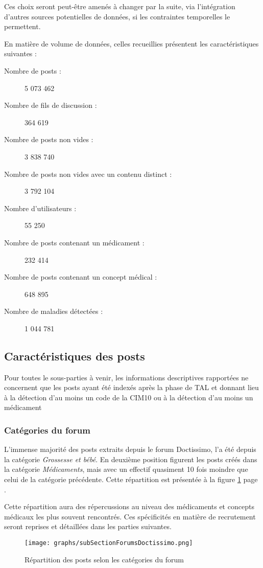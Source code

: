 \documentclass[a4paper, 12pt, openany, oneside, abstract=on]{article} %
\begin{document}
Ces choix seront peut-être amenés à changer par la suite, via l'intégration d'autres sources potentielles de données, si les contraintes temporelles le permettent.

En matière de volume de données, celles recueillies présentent les caractéristiques suivantes :
\begin{description}
    \item[Nombre de posts :] 5 073 462
    \item[Nombre de fils de discussion :] 364 619
    \item[Nombre de posts non vides :] 3 838 740
    \item[Nombre de posts non vides avec un contenu distinct :] 3 792 104
    \item[Nombre d'utilisateurs :] 55 250
    \item[Nombre de posts contenant un médicament :] 232 414
    \item[Nombre de posts contenant un concept médical :] 648 895
    \item[Nombre de maladies détectées :] 1 044 781
\end{description}

\subsection{Caractéristiques des posts}
Pour toutes le sous-parties à venir, les informations descriptives rapportées ne concernent que les posts ayant été indexés après la phase de TAL et donnant lieu à la détection d'au moins un code de la CIM10 ou à la détection d'au moins un médicament

\subsubsection{Catégories du forum}
L'immense majorité des posts extraits depuis le forum Doctissimo, l'a été depuis la catégorie \emph{Grossesse et bébé}. En deuxième position figurent les posts créés dans la catégorie \emph{Médicaments}, mais avec un effectif quasiment 10 fois moindre que celui de la catégorie précédente. Cette répartition est présentée à la figure \ref{fig:EffCtgForum} page \pageref{fig:EffCtgForum}.

Cette répartition aura des répercussions au niveau des médicaments et concepts médicaux les plus souvent rencontrés. Ces spécificités en matière de recrutement seront reprises et détaillées dans les parties suivantes.
\begin{figure}[H]
    \centering
    \texttt{[image: graphs/subSectionForumsDoctissimo.png]}
    \caption{\label{fig:EffCtgForum}Répartition des posts selon les catégories du forum}
\end{figure}
\end{document}
